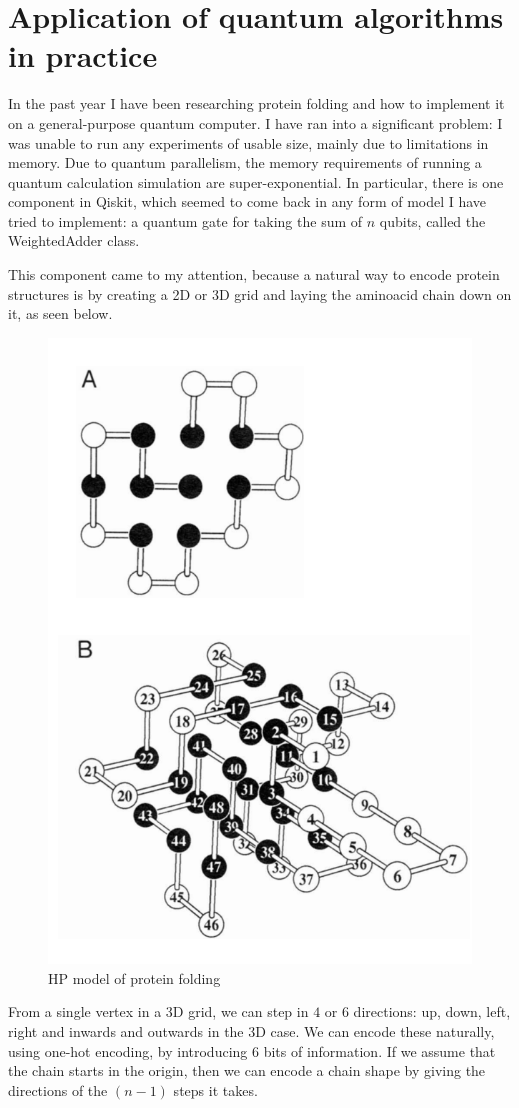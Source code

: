 \chapter{Application of quantum algorithms in practice}

In the past year I have been researching protein folding and how to implement it on a general-purpose quantum computer. I have ran into a significant problem: I was unable to run any experiments of usable size, mainly due to limitations in memory. Due to quantum parallelism, the memory requirements of running a quantum calculation simulation are super-exponential. In particular, there is one component in Qiskit, which seemed to come back in any form of model I have tried to implement: a quantum gate for taking the sum of $n$ qubits, called the WeightedAdder class. 

This component came to my attention, because a natural way to encode protein structures is by creating a 2D or 3D grid and laying the aminoacid chain down on it\cite{dill_principles_2008}, as seen below.

\begin{figure}[H]
    \centering
    \includegraphics[width=0.5\linewidth]{figures/bioinformatics/hp_model.png}
    \caption{HP model of protein folding\cite{dill_principles_2008}}
\end{figure}

From a single vertex in a 3D grid, we can step in $4$ or $6$ directions: up, down, left, right and inwards and outwards in the 3D case. We can encode these naturally, using one-hot encoding, by introducing $6$ bits of information. If we assume that the chain starts in the origin, then we can encode a chain shape by giving the directions of the $(n-1)$ steps it takes.

